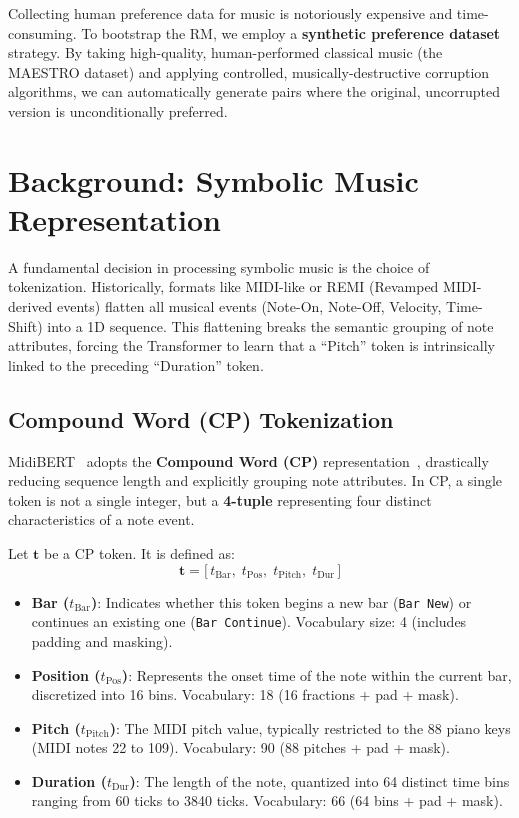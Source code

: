 \documentclass[11pt,a4paper]{article}
\begin{document}
Collecting human preference data for music is notoriously expensive and time-consuming. To bootstrap the RM, we employ a \textbf{synthetic preference dataset} strategy. By taking high-quality, human-performed classical music (the MAESTRO dataset) and applying controlled, musically-destructive corruption algorithms, we can automatically generate pairs where the original, uncorrupted version is unconditionally preferred. 

\section{Background: Symbolic Music Representation}

A fundamental decision in processing symbolic music is the choice of tokenization. Historically, formats like MIDI-like or REMI (Revamped MIDI-derived events) flatten all musical events (Note-On, Note-Off, Velocity, Time-Shift) into a 1D sequence. This flattening breaks the semantic grouping of note attributes, forcing the Transformer to learn that a ``Pitch'' token is intrinsically linked to the preceding ``Duration'' token.

\subsection{Compound Word (CP) Tokenization}

MidiBERT~\cite{midibertpiano} adopts the \textbf{Compound Word (CP)} representation~\cite{cp_representation}, drastically reducing sequence length and explicitly grouping note attributes. In CP, a single token is not a single integer, but a \textbf{4-tuple} representing four distinct characteristics of a note event.

Let $\mathbf{t}$ be a CP token. It is defined as:
\begin{equation}
    \mathbf{t} = \bigl[\,t_{\text{Bar}},\; t_{\text{Pos}},\; t_{\text{Pitch}},\; t_{\text{Dur}}\,\bigr]
\end{equation}

\begin{itemize}
    \item \textbf{Bar ($t_{\text{Bar}}$)}: Indicates whether this token begins a new bar (\texttt{Bar New}) or continues an existing one (\texttt{Bar Continue}). Vocabulary size: 4 (includes padding and masking).
    \item \textbf{Position ($t_{\text{Pos}}$)}: Represents the onset time of the note within the current bar, discretized into 16 bins. Vocabulary: 18 (16 fractions + pad + mask).
    \item \textbf{Pitch ($t_{\text{Pitch}}$)}: The MIDI pitch value, typically restricted to the 88 piano keys (MIDI notes 22 to 109). Vocabulary: 90 (88 pitches + pad + mask).
    \item \textbf{Duration ($t_{\text{Dur}}$)}: The length of the note, quantized into 64 distinct time bins ranging from 60 ticks to 3840 ticks. Vocabulary: 66 (64 bins + pad + mask).
\end{itemize}
\end{document}
